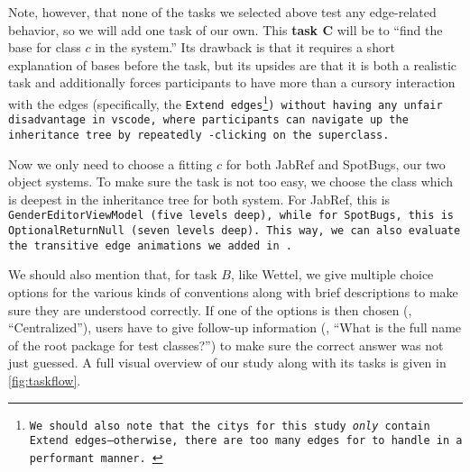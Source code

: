 \documentclass[../thesis]{subfiles}
\begin{document}
Note, however, that none of the tasks we selected above test any edge-related behavior, so we will add one task of our own.
This \textbf{task $\bm{C}$} will be to \enquote{find the \gls{base} for class $c$ in the system.}
Its drawback is that it requires a short explanation of \glspl{base} before the task, but its upsides are that it is both a realistic task and additionally forces participants to have more than a cursory interaction with the edges (specifically, the \tt{Extend} edges\footnote{
	We should also note that the \glspl{city} for this study \emph{only} contain \tt{Extend} edges---otherwise, there are too many edges for \SEE{} to handle in a performant manner.
}) without having any unfair disadvantage in \gls{vscode}, where participants can navigate up the inheritance tree by repeatedly -clicking on the superclass.

Now we only need to choose a fitting $c$ for both JabRef and SpotBugs, our two object systems.
To make sure the task is not too easy, we choose the class which is deepest in the inheritance tree for both system.
For JabRef, this is \tt{GenderEditorViewModel} (five levels deep), while for SpotBugs, this is \tt{OptionalReturnNull} (seven levels deep).
This way, we can also evaluate the transitive edge animations we added in .

We should also mention that, for task $B$, like Wettel, we give multiple choice options for the various kinds of conventions along with brief descriptions to make sure they are understood correctly.
If one of the options is then chosen (\eg, \enquote{Centralized}), users have to give follow-up information (\eg, \enquote{What is the full name of the root package for test classes?}) to make sure the correct answer was not just guessed.
A full visual overview of our study along with its tasks is given in \cref{fig:taskflow}.
\end{document}
